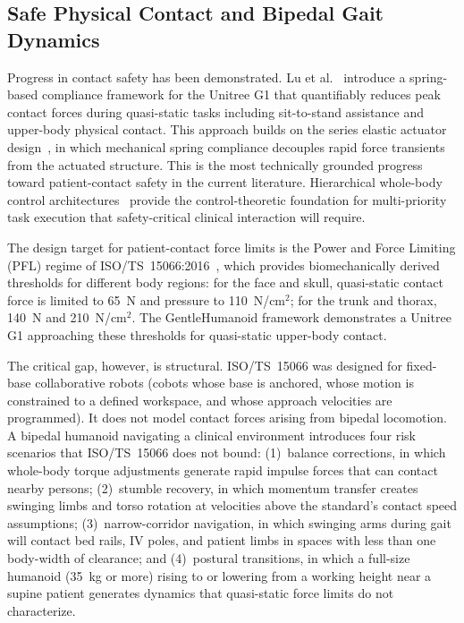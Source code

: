 \documentclass[acmjour]{acmart}
\begin{document}
\subsection{Safe Physical Contact and Bipedal Gait Dynamics}
\label{sec:safety}

Progress in contact safety has been demonstrated. Lu et
al.~\cite{lu2025gentlehumanoid} introduce a spring-based compliance framework for
the Unitree G1 that quantifiably reduces peak contact forces during quasi-static
tasks including sit-to-stand assistance and upper-body physical contact. This
approach builds on the series elastic actuator design~\cite{pratt1995elastic},
in which mechanical spring compliance decouples rapid force transients from the
actuated structure. This is the most technically grounded progress toward
patient-contact safety in the current literature. Hierarchical whole-body control
architectures~\cite{sentis2005synthesis} provide the control-theoretic foundation
for multi-priority task execution that safety-critical clinical interaction will
require.

The design target for patient-contact force limits is the Power and Force
Limiting (PFL) regime of ISO/TS~15066:2016~\cite{isots15066}, which provides
biomechanically derived thresholds for different body regions: for the face and skull, quasi-static
contact force is limited to 65~N and pressure to 110~N/cm$^2$; for the trunk and
thorax, 140~N and 210~N/cm$^2$. The GentleHumanoid framework demonstrates a
Unitree G1 approaching these thresholds for quasi-static upper-body contact.

The critical gap, however, is structural. ISO/TS~15066 was designed for
fixed-base collaborative robots (cobots whose base is anchored, whose motion is
constrained to a defined workspace, and whose approach velocities are programmed).
It does not model contact forces arising from bipedal locomotion. A bipedal
humanoid navigating a clinical environment introduces four risk scenarios that
ISO/TS~15066 does not bound: (1)~balance corrections, in which whole-body torque
adjustments generate rapid impulse forces that can contact nearby persons;
(2)~stumble recovery, in which momentum transfer creates swinging limbs and torso
rotation at velocities above the standard's contact speed assumptions;
(3)~narrow-corridor navigation, in which swinging arms during gait will contact
bed rails, IV poles, and patient limbs in spaces with less than one body-width of
clearance; and (4)~postural transitions, in which a full-size humanoid (35~kg or
more) rising to or lowering from a working height near a supine patient generates
dynamics that quasi-static force limits do not characterize.
\end{document}
